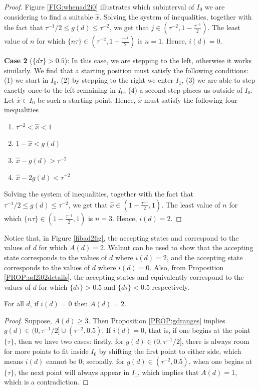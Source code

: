 \documentclass[10pt,a4paper,reqno]{amsart}
\newcommand{\walnut}{{\ttfamily Walnut}}
\begin{document}
\begin{proof}
Figure \ref{FIG:whenad2i0} illustrates which subinterval of $I_0$ we are considering to find a suitable $\hat{x}$. Solving the system of inequalities, together with the fact that $\tau^{-1}/2 \leq g(d) \leq \tau^{-2}$, we get that $j\in(\tau^{-2},1-\frac{\tau^{-1}}{2})$. The least value of $n$ for which $\{ n\tau \} \in (\tau^{-2},1-\frac{\tau^{-1}}{2})$ is $n=1$. Hence, $i(d)=0$.

\textbf{Case 2} ($\{ d\tau\} > 0.5$): In this case, we are stepping to the left, otherwise it works similarly. We find that a starting position must satisfy the following conditions: (1) we start in $I_0$, (2) by stepping to the right we enter $I_1$, (3) we are able to step exactly once to the left remaining in $I_0$, (4) a second step places us outside of $I_0$. Let $\hat{x}\in I_0$ be such a starting point. Hence, $\hat{x}$ must satisfy the following four inequalities
\begin{enumerate}
\item[(i)] $\tau^{-2}<\hat{x}<1$
\item[(ii)] $1-\hat{x}<g(d)$
\item[(iii)] $\hat{x}-g(d)>\tau^{-2}$
\item[(iv)] $\hat{x}-2g(d)<\tau^{-2}$
\end{enumerate}
Solving the system of inequalities, together with the fact that $\tau^{-1}/2 \leq g(d) \leq \tau^{-2}$, we get that $\hat{x}\in(1-\frac{\tau^{-1}}{2},1)$. The least value of $n$ for which $\{ n\tau \} \in (1-\frac{\tau^{-1}}{2},1)$ is $n=3$. Hence, $i(d)=2$.
\end{proof}
\begin{rem}
Notice that, in Figure \ref{fibad2fig}, the accepting states {} and {} correspond to the values of $d$ for which $A(d)=2$. \walnut{} can be used to show that the accepting state {} corresponds to the values of $d$ where $i(d)=2$, and  the accepting state {} corresponds to the values of $d$ where $i(d)=0$. Also, from Proposition \ref{PROP:ad2i02details}, the accepting states {} and {} equivalently correspond to the values of $d$ for which $\{ d\tau\}>0.5$ and $\{ d\tau\}<0.5$ respectively.
\end{rem}
\begin{prop}\label{PROP:id0Ad2}
For all $d$, if $i(d)=0$ then $A(d)=2$.
\end{prop}
\begin{proof}
Suppose, $A(d)\geq3$. Then Proposition \ref{PROP:gdranges} implies $g(d)\in(0,\tau^{-1}/2]\cup(\tau^{-2},0.5)$. If $i(d)=0$, that is, if one begins at the point $\{ \tau \}$, then we have two cases: firstly, for $g(d)\in(0,\tau^{-1}/2]$, there is always room for more points to fit inside $I_0$ by shifting the first point to either side, which means $i(d)$ cannot be $0$; secondly, for $g(d)\in(\tau^{-2},0.5)$, when one begins at $\{ \tau \}$, the next point will always appear in $I_1$, which implies that $A(d)=1$, which is a contradiction.
\end{proof}
\end{document}
